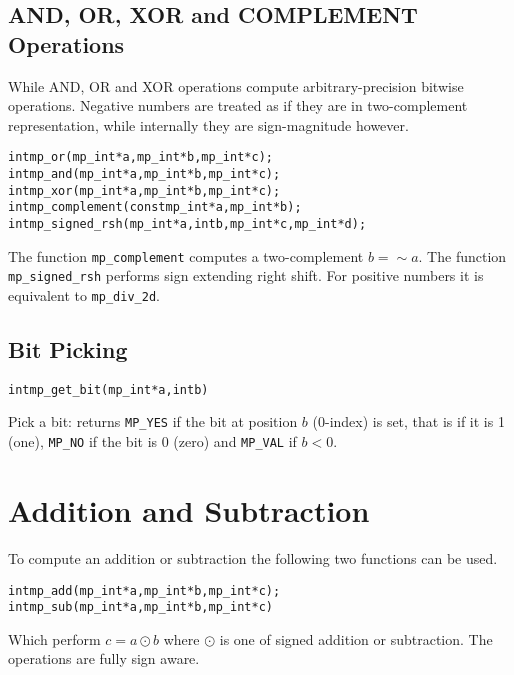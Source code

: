 \documentclass[synpaper]{book}
\begin{document}
\subsection{AND, OR, XOR and COMPLEMENT Operations}

While AND, OR and XOR operations compute arbitrary-precision bitwise operations. Negative numbers
are treated as if they are in two-complement representation, while internally they are sign-magnitude however.

   
\begin{alltt}
int mp_or  (mp_int * a, mp_int * b, mp_int * c);
int mp_and (mp_int * a, mp_int * b, mp_int * c);
int mp_xor (mp_int * a, mp_int * b, mp_int * c);
int mp_complement(const mp_int *a, mp_int *b);
int mp_signed_rsh(mp_int * a, int b, mp_int * c, mp_int * d);
\end{alltt}

The function \texttt{mp\_complement} computes a two-complement $b = \sim a$. The function \texttt{mp\_signed\_rsh} performs
sign extending right shift. For positive numbers it is equivalent to \texttt{mp\_div\_2d}.

\subsection{Bit Picking}
\begin{alltt}
int mp_get_bit(mp_int *a, int b)
\end{alltt}

Pick a bit: returns \texttt{MP\_YES} if the bit at position $b$ (0-index) is set, that is if it is 1 (one), \texttt{MP\_NO}
if the bit is 0 (zero) and \texttt{MP\_VAL} if $b < 0$.

\section{Addition and Subtraction}

To compute an addition or subtraction the following two functions can be used.

 
\begin{alltt}
int mp_add (mp_int * a, mp_int * b, mp_int * c);
int mp_sub (mp_int * a, mp_int * b, mp_int * c)
\end{alltt}

Which perform $c = a \odot b$ where $\odot$ is one of signed addition or subtraction.  The operations are fully sign
aware.
\end{document}
